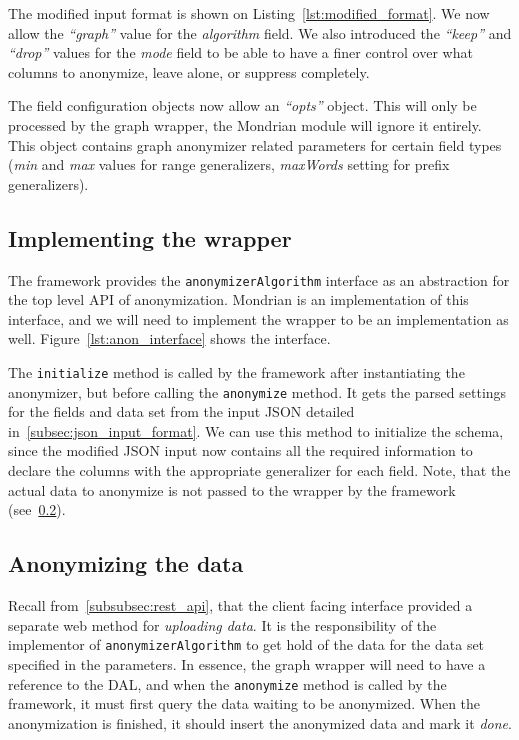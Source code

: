\vspace{\baselineskip}



The modified input format is shown on Listing~\ref{lst:modified_format}. We now allow the \textit{``graph''} value for the \textit{algorithm} field. We also introduced the \textit{``keep''} and \textit{``drop''} values for the \textit{mode} field to be able to have a finer control over what columns to anonymize, leave alone, or suppress completely.

The field configuration objects now allow an \textit{``opts''} object. This will only be processed by the graph wrapper, the Mondrian module will ignore it entirely. This object contains graph anonymizer related parameters for certain field types (\textit{min} and \textit{max} values for range generalizers, \textit{maxWords} setting for prefix generalizers).

\subsection{Implementing the wrapper}

The framework provides the \texttt{anonymizerAlgorithm} interface as an abstraction for the top level API of anonymization. Mondrian is an implementation of this interface, and we will need to implement the wrapper to be an implementation as well. Figure~\ref{lst:anon_interface} shows the interface.

\vspace{\baselineskip}


The \texttt{initialize} method is called by the framework after instantiating the anonymizer, but before calling the \texttt{anonymize} method. It gets the parsed settings for the fields and data set from the input JSON detailed in~\ref{subsec:json_input_format}. We can use this method to initialize the schema, since the modified JSON input now contains all the required information to declare the columns with the appropriate generalizer for each field. Note, that the actual data to anonymize is not passed to the wrapper by the framework (see~\ref{subsec:anonymizing_the_data}).

\subsection{Anonymizing the data}\label{subsec:anonymizing_the_data}

Recall from~\ref{subsubsec:rest_api}, that the client facing interface provided a separate web method for \emph{uploading data}. It is the responsibility of the implementor of \texttt{anonymizerAlgorithm} to get hold of the data for the data set specified in the parameters. In essence, the graph wrapper will need to have a reference to the DAL, and when the \texttt{anonymize} method is called by the framework, it must first query the data waiting to be anonymized. When the anonymization is finished, it should insert the anonymized data and mark it \emph{done}.


